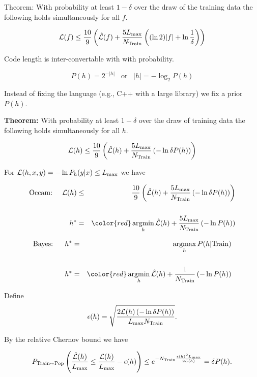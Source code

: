 {\vfill
Theorem: With probability at least $1-\delta$ over the draw of the training data the following holds simultaneously for all $f$.

{\color{red} $${\cal L}(f) \leq \frac{10}{9}\left(\hat{{\cal L}}(f) + \frac{5L_{\max}}{N_\mathrm{Train}}\left((\ln 2)|f| +\ln\frac{1}{\delta}\right)\right)$$}



Code length is inter-convertable with with probability.

$$P(h) = 2^{-|h|}\;\;\;\mbox{or}\;\;\;|h| = - \log_2 P(h)$$

\vfill
Instead of fixing the language (e.g., C++ with a large library) we fix a prior $P(h)$.

\vfill
    {\bf Theorem:} With probability
    at least $1-\delta$ over the draw of training data the following holds simultaneously for all $h$.

\vfill
    $${\cal L}(h) \leq \frac{10}{9}\left(\hat{\cal L}(h) + \frac{5 L_\mathrm{max}}{N_\mathrm{Train}}\left(- \ln \delta P(h)\right)\right)$$


For {\color{red} ${\cal L}(h,x,y) = -\ln P_h(y|x) \leq L_{\mathrm{max}}$} we have

\vfill
\begin{eqnarray*}
\mbox{Occam:}\;\;\;\;\;{\cal L}(h) & \leq & \frac{10}{9}\parens{\hat{\cal L}(h) + \frac{5 L_\mathrm{max}}{N_\mathrm{Train}}\parens{- \ln \delta P(h)}} \\
\\
h^* & = & {\color{red} \argmin_h \hat{\cal L}(h) + \frac{5 L_\mathrm{max}}{N_\mathrm{Train}}\parens{- \ln P(h)}}
\end{eqnarray*}

\vfill
\begin{eqnarray*}
\mbox{Bayes:}\;\;\;\;\;\;h^* & = & \argmax_h P(h|\train) \\
\\
h^* & = & {\color{red} \argmin_h \hat{\cal L}(h) + \frac{1}{N_\mathrm{Train}}\parens{- \ln P(h)}}
\end{eqnarray*}


Define
$$\epsilon(h) = \sqrt{\frac{2{\cal L}(h)\left(-\ln \delta P(h)\right)}{L_{\max} N_\mathrm{Train}}}.$$

\vfill
By the relative Chernov bound we have

\vfill
$$P_{\mathrm{Train} \sim \mathrm{Pop}}\left(\frac{\hat{{\cal L}}(h)}{L_{\max}} \leq \frac{{\cal L}(h)}{L_{\max}} - \epsilon(h)\right) \leq e^{-N_\mathrm{Train}\frac{\epsilon(h)^2L_{\max}}{2{\cal L}(h)}} = \delta P(h).$$

}
